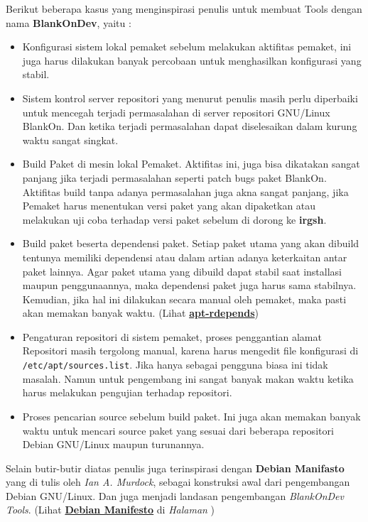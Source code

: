 \noindent
Berikut beberapa kasus yang menginspirasi penulis untuk membuat Tools dengan nama \textbf{BlankOnDev}, yaitu :
\begin{itemize}
	\item Konfigurasi sistem lokal pemaket sebelum melakukan aktifitas pemaket, ini juga harus dilakukan banyak percobaan untuk menghasilkan konfigurasi yang stabil.
	
	\item Sistem kontrol server repositori yang menurut penulis masih perlu diperbaiki untuk mencegah terjadi permasalahan di server repositori GNU/Linux BlankOn. Dan ketika terjadi permasalahan dapat diselesaikan dalam kurung waktu sangat singkat.
	
	\item Build Paket di mesin lokal Pemaket. Aktifitas ini, juga bisa dikatakan sangat panjang jika terjadi permasalahan seperti patch bugs paket BlankOn. Aktifitas build tanpa adanya permasalahan juga akna sangat panjang, jika Pemaket harus menentukan versi paket yang akan dipaketkan atau melakukan uji coba terhadap versi paket sebelum di dorong ke \textbf{irgsh}.
	
	\item Build paket beserta dependensi paket. Setiap paket utama yang akan dibuild tentunya memiliki dependensi atau dalam artian adanya keterkaitan antar paket lainnya. Agar paket utama yang dibuild dapat stabil saat installasi maupun penggunaannya, maka dependensi paket juga harus sama stabilnya. Kemudian, jika hal ini dilakukan secara manual oleh pemaket, maka pasti akan memakan banyak waktu. (Lihat \hyperref[text:apt-rdepends]{\textbf{apt-rdepends}})
	
	\item Pengaturan repositori di sistem pemaket, proses penggantian alamat Repositori masih tergolong manual, karena harus mengedit file konfigurasi di \texttt{/etc/apt/sources.list}. Jika hanya sebagai pengguna biasa ini tidak masalah. Namun untuk pengembang ini sangat banyak makan waktu ketika harus melakukan pengujian terhadap repositori.
	
	\item Proses pencarian source sebelum build paket. Ini juga akan memakan banyak waktu untuk mencari source paket yang sesuai dari beberapa repositori Debian GNU/Linux maupun turunannya.
\end{itemize}

\noindent
Selain butir-butir diatas penulis juga terinspirasi dengan \textbf{Debian Manifasto} yang di tulis oleh \textit{Ian A. Murdock}, sebagai konstruksi awal dari pengembangan Debian GNU/Linux. Dan juga menjadi landasan pengembangan \textit{BlankOnDev Tools}. (Lihat \hyperref[appdx::deb_manifesto]{\textbf{Debian Manifesto}} di \textit{Halaman \pageref{appdx::deb_manifesto}})

